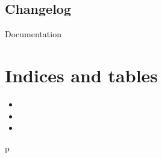 \documentclass[letterpaper,10pt,english]{sphinxmanual}
\begin{document}
\section{Changelog}
\label{\detokenize{changelog:changelog}}\label{\detokenize{changelog::doc}}
Documentation


\chapter{Indices and tables}
\label{\detokenize{index:indices-and-tables}}\begin{itemize}
\item {} 

\item {} 

\item {} 

\end{itemize}


\renewcommand{\indexname}{Python Module Index}
\begin{sphinxtheindex}
\def\bigletter#1{{\Large\sffamily#1}\nopagebreak\vspace{1mm}}
\bigletter{p}
\item {}
\item {}
\end{sphinxtheindex}

\renewcommand{\indexname}{Index}
\printindex
\end{document}
